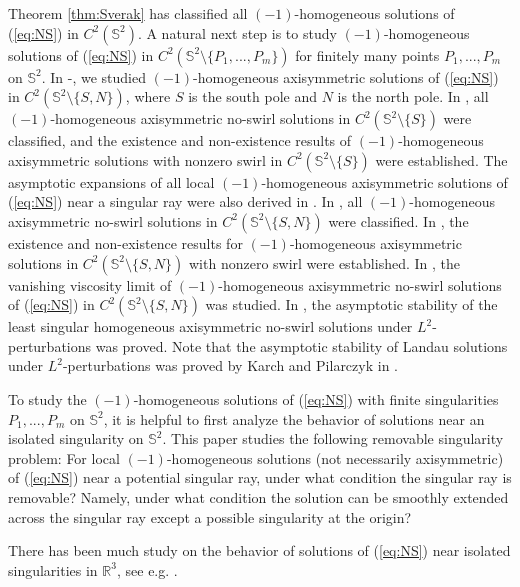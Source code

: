 \documentclass[12pt]{article}
\newcommand{\R}{\mathbb{R}}
\newcommand{\bS}{\mathbb{S}}
\begin{document}
Theorem \ref{thm:Sverak} has classified all $(-1)$-homogeneous solutions of (\ref{eq:NS}) in $C^2(\mathbb{S}^2)$. A natural next step is to study $(-1)$-homogeneous solutions of (\ref{eq:NS}) in $C^{2}(\mathbb{S}^2\setminus\{P_1,..., P_m\})$ for finitely many points $P_1,..., P_m$ on $\mathbb{S}^2$.  In \cite{LLY1}-\cite{LY}, we %
 studied $(-1)$-homogeneous axisymmetric solutions of (\ref{eq:NS}) in $C^2(\mathbb{S}^2\setminus\{S, N\})$, where $S$ is the south pole and $N$ is the north pole. In \cite{LLY1},  all $(-1)$-homogeneous axisymmetric no-swirl solutions in $C^2(\mathbb{S}^2\setminus\{S\})$ were classified, and the existence and non-existence results of $(-1)$-homogeneous axisymmetric solutions with nonzero swirl in $C^2(\mathbb{S}^2\setminus\{S\})$ were established. The asymptotic expansions of all local $(-1)$-homogeneous axisymmetric solutions of (\ref{eq:NS}) near a singular ray were also derived in \cite{LLY1}. In \cite{LLY2},  all $(-1)$-homogeneous axisymmetric no-swirl solutions in $C^2(\mathbb{S}^2\setminus\{S, N\})$ were classified. In \cite{LLY3},  the existence and non-existence results for $(-1)$-homogeneous axisymmetric solutions in $C^2(\mathbb{S}^2\setminus\{S, N\})$ with nonzero swirl were established. In \cite{LLY4}, the vanishing viscosity limit of $(-1)$-homogeneous axisymmetric no-swirl solutions of (\ref{eq:NS}) in $C^2(\mathbb{S}^2\setminus\{S, N\})$ was studied. In \cite{LY}, the asymptotic stability of the least singular homogeneous axisymmetric no-swirl solutions under $L^2$-perturbations was proved. Note that the asymptotic stability of Landau solutions under $L^2$-perturbations was proved by Karch and Pilarczyk in \cite{KP}. 

To study the $(-1)$-homogeneous solutions of (\ref{eq:NS}) with finite singularities $P_1, ..., P_m$ on $\bS^2$, it is helpful to first analyze the behavior of solutions near an isolated singularity on $\bS^2$. This paper studies the following removable singularity problem: For local $(-1)$-homogeneous solutions (not necessarily axisymmetric) of (\ref{eq:NS}) near a potential singular ray, under what condition the singular ray is removable? Namely, under what condition the solution can be smoothly extended across the singular ray except a possible singularity at the origin? 

There has been much study on the behavior of solutions of (\ref{eq:NS}) near isolated singularities in $\R^3$, see e.g. \cite{DE70, Shapiro1, Shapiro2, Shapiro3, CK00, KK06, KS11, MT12, NP00, Sverak}. 
\end{document}
